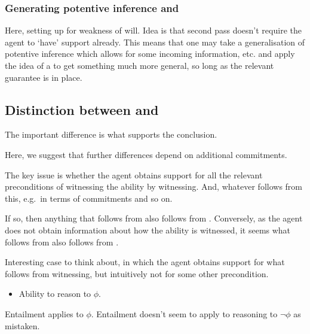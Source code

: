 \subsubsection{Generating potentive inference and \future{}}
\label{sec:generaling-future}

\begin{note}[Idea]
  Here, setting up for weakness of will.
  Idea is that second pass doesn't require the agent to `have' support already.
  This means that one may take a generalisation of potentive inference which allows for some incoming information, etc. and apply the idea of a \future{} to get something much more general, so long as the relevant guarantee is in place.
\end{note}


\subsection{Distinction between \AR{} and \WR{}}
\label{sec:dist-betw-ar}

\begin{note}[Overview]
  The important difference is what supports the conclusion.

  Here, we suggest that further differences depend on additional commitments.
\end{note}


\begin{note}
  The key issue is whether the agent obtains support for all the relevant preconditions of witnessing the ability by witnessing.
  And, whatever follows from this, e.g.\ in terms of commitments and so on.

  If so, then anything that follows from \AR{} also follows from \WR{}.
  Conversely, as the agent does not obtain information about how the ability is witnessed, it seems what follows from \WR{} also follows from \AR{}.
\end{note}

\begin{note}
  Interesting case to think about, in which the agent obtains support for what follows from witnessing, but intuitively not for some other precondition.
  \begin{itemize}
  \item Ability to reason to \(\phi\).
  \end{itemize}
  Entailment applies to \(\phi\).
  Entailment doesn't seem to apply to reasoning to \(\lnot\phi\) as mistaken.
\end{note}

